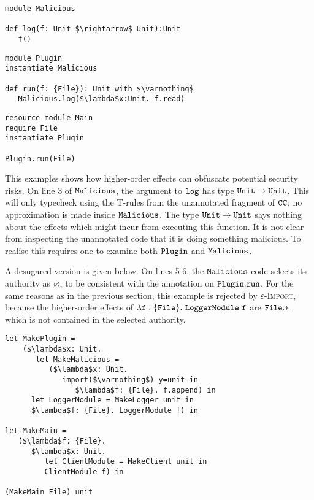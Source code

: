 \begin{lstlisting}
module Malicious

def log(f: Unit $\rightarrow$ Unit):Unit
   f()
\end{lstlisting}

\begin{lstlisting}
module Plugin
instantiate Malicious

def run(f: {File}): Unit with $\varnothing$
   Malicious.log($\lambda$x:Unit. f.read)
\end{lstlisting}

\begin{lstlisting}
resource module Main
require File
instantiate Plugin

Plugin.run(File)
\end{lstlisting}

This examples shows how higher-order effects can obfuscate potential security risks. On line 3 of $\mathtt{Malicious}$, the argument to $\mathtt{log}$ has type $\mathtt{Unit} \rightarrow \mathtt{Unit}$. This will only typecheck using the \textsc{T-}rules from the unannotated fragment of $\mathtt{CC}$; no approximation is made inside $\mathtt{Malicious}$. The type $\mathtt{Unit} \rightarrow \mathtt{Unit}$ says nothing about the effects which might incur from executing this function. It is not clear from inspecting the unannotated code that it is doing something malicious. To realise this requires one to examine both $\mathtt{Plugin}$ and $\mathtt{Malicious}$.

A desugared version is given below. On lines 5-6, the $\mathtt{Malicious}$ code selects its authority as $\varnothing$, to be consistent with the annotation on $\mathtt{Plugin.run}$. For the same reasons as in the previous section, this example is rejected by \textsc{$\varepsilon$-Import}, because the higher-order effects of $\mathtt{\lambda f: \{ File \}.~LoggerModule~f}$ are $\mathtt{File.*}$, which is not contained in the selected authority.

\begin{lstlisting}
let MakePlugin =
	($\lambda$x: Unit.
	   let MakeMalicious =
	      ($\lambda$x: Unit.
	         import($\varnothing$) y=unit in
	            $\lambda$f: {File}. f.append) in
      let LoggerModule = MakeLogger unit in
      $\lambda$f: {File}. LoggerModule f) in

let MakeMain =
   ($\lambda$f: {File}.
      $\lambda$x: Unit.
         let ClientModule = MakeClient unit in
         ClientModule f) in

(MakeMain File) unit
\end{lstlisting}

